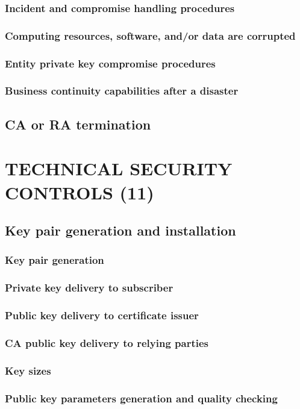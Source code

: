 \documentclass[10pt]{article}
\begin{document}
\subsubsection{Incident and compromise handling procedures}
\subsubsection{Computing resources, software, and/or data are corrupted}
\subsubsection{Entity private key compromise procedures}
\subsubsection{Business continuity capabilities after a disaster}
\subsection{CA or RA termination}
\section{TECHNICAL SECURITY CONTROLS (11)}
\subsection{Key pair generation and installation}
\subsubsection{Key pair generation}
\subsubsection{Private key delivery to subscriber}
\subsubsection{Public key delivery to certificate issuer}
\subsubsection{CA public key delivery to relying parties}
\subsubsection{Key sizes}
\subsubsection{Public key parameters generation and quality checking}
\end{document}
